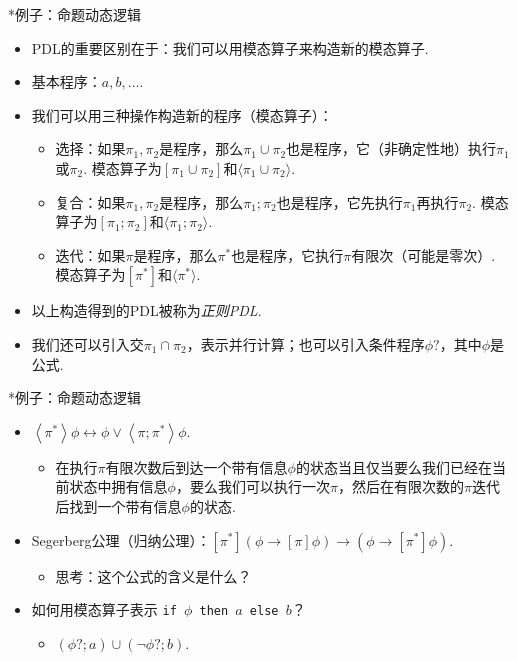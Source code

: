     
    {*例子：命题动态逻辑}
    \begin{itemize}
        \item PDL的重要区别在于：我们可以用模态算子来构造新的模态算子.
        \item 基本程序：$a,b,\dots$.
        \item 我们可以用三种操作构造新的程序（模态算子）：
        \begin{itemize}
            \item 选择：如果$\pi_1,\pi_2$是程序，那么$\pi_1\cup\pi_2$也是程序，它（非确定性地）执行$\pi_1$或$\pi_2$. 模态算子为$[\pi_1\cup\pi_2]$和$\langle\pi_1\cup\pi_2\rangle$.
            \item 复合：如果$\pi_1,\pi_2$是程序，那么$\pi_1;\pi_2$也是程序，它先执行$\pi_1$再执行$\pi_2$. 模态算子为$[\pi_1;\pi_2]$和$\langle\pi_1;\pi_2\rangle$.
            \item 迭代：如果$\pi$是程序，那么$\pi^*$也是程序，它执行$\pi$有限次（可能是零次）. 模态算子为$[\pi^*]$和$\langle\pi^*\rangle$.
        \end{itemize}
        \item 以上构造得到的PDL被称为\emph{正则PDL}.
        \item 我们还可以引入交$\pi_1\cap\pi_2$，表示并行计算；也可以引入条件程序$\phi?$，其中$\phi$是公式.
    \end{itemize}
    
    
    {*例子：命题动态逻辑}
    \begin{itemize}
        \item $\left\langle\pi^*\right\rangle \phi \leftrightarrow \phi \vee\left\langle\pi ; \pi^*\right\rangle \phi$.
        \begin{itemize}
            \item 在执行$\pi$有限次数后到达一个带有信息$\phi$的状态当且仅当要么我们已经在当前状态中拥有信息$\phi$，要么我们可以执行一次$\pi$，然后在有限次数的$\pi$迭代后找到一个带有信息$\phi$的状态.
        \end{itemize}
        \item Segerberg公理（归纳公理）：$[\pi^*](\phi \to [\pi]\phi) \to (\phi \to [\pi^*]\phi).$
        \begin{itemize}
            \item 思考：这个公式的含义是什么？
        \end{itemize}
        \item 如何用模态算子表示
        \texttt{if $\phi$ then $a$ else $b$}？
        \begin{itemize}
            \item $(\phi?;a)\cup(\neg\phi?;b)$.
        \end{itemize}
    \end{itemize}
    

